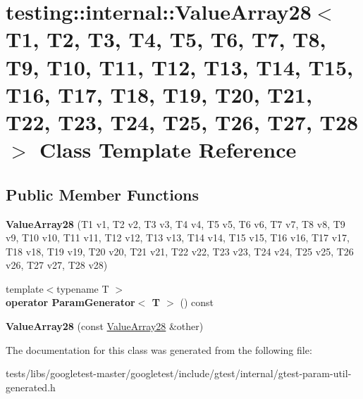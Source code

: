 \hypertarget{classtesting_1_1internal_1_1ValueArray28}{}\section{testing\+:\+:internal\+:\+:Value\+Array28$<$ T1, T2, T3, T4, T5, T6, T7, T8, T9, T10, T11, T12, T13, T14, T15, T16, T17, T18, T19, T20, T21, T22, T23, T24, T25, T26, T27, T28 $>$ Class Template Reference}
\label{classtesting_1_1internal_1_1ValueArray28}
\subsection*{Public Member Functions}
\begin{DoxyCompactItemize}
\item 
\mbox{\label{classtesting_1_1internal_1_1ValueArray28_a5d8e6b5ec2753a95857e57a713d034c4}} 
{\bfseries Value\+Array28} (T1 v1, T2 v2, T3 v3, T4 v4, T5 v5, T6 v6, T7 v7, T8 v8, T9 v9, T10 v10, T11 v11, T12 v12, T13 v13, T14 v14, T15 v15, T16 v16, T17 v17, T18 v18, T19 v19, T20 v20, T21 v21, T22 v22, T23 v23, T24 v24, T25 v25, T26 v26, T27 v27, T28 v28)
\item 
\mbox{\label{classtesting_1_1internal_1_1ValueArray28_a8164f1537b7e640ef17be3d70e65c448}} 
{\footnotesize template$<$typename T $>$ }\\{\bfseries operator Param\+Generator$<$ T $>$} () const
\item 
\mbox{\label{classtesting_1_1internal_1_1ValueArray28_abd9c216c57cf10dfc4690630f18926f4}} 
{\bfseries Value\+Array28} (const \hyperlink{classtesting_1_1internal_1_1ValueArray28}{Value\+Array28} \&other)
\end{DoxyCompactItemize}


The documentation for this class was generated from the following file\+:\begin{DoxyCompactItemize}
\item 
tests/libs/googletest-\/master/googletest/include/gtest/internal/gtest-\/param-\/util-\/generated.\+h\end{DoxyCompactItemize}
